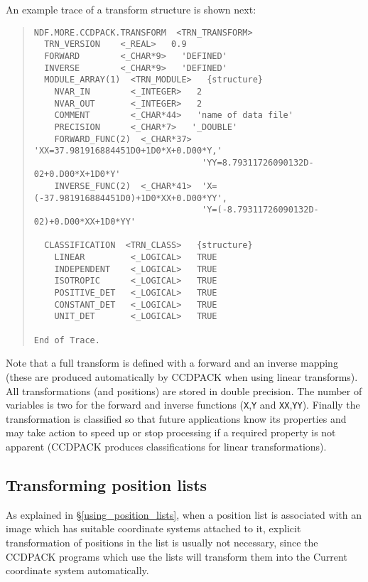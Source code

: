 \documentclass[twoside,11pt]{article}
\newcommand{\hyperref}[4]{#2\ref{#4}#3}
\newcommand{\xlabel}[1]{}
\renewcommand{\_}{\texttt{\symbol{95}}}
\newenvironment{myquote}{\begin{quote}\begin{small}}{\end{small}\end{quote}}
\newcommand{\text}[1]{{\small \tt #1}}
\begin{document}
An example trace of a transform structure is shown next:
\begin{myquote}
\begin{verbatim}
NDF.MORE.CCDPACK.TRANSFORM  <TRN_TRANSFORM>
  TRN_VERSION    <_REAL>   0.9
  FORWARD        <_CHAR*9>   'DEFINED'
  INVERSE        <_CHAR*9>   'DEFINED'
  MODULE_ARRAY(1)  <TRN_MODULE>   {structure}
    NVAR_IN        <_INTEGER>   2
    NVAR_OUT       <_INTEGER>   2
    COMMENT        <_CHAR*44>   'name of data file'
    PRECISION      <_CHAR*7>   '_DOUBLE'
    FORWARD_FUNC(2)  <_CHAR*37>  'XX=37.981916884451D0+1D0*X+0.D00*Y,'
                                 'YY=8.79311726090132D-02+0.D00*X+1D0*Y'
    INVERSE_FUNC(2)  <_CHAR*41>  'X=(-37.981916884451D0)+1D0*XX+0.D00*YY',
                                 'Y=(-8.79311726090132D-02)+0.D00*XX+1D0*YY'

  CLASSIFICATION  <TRN_CLASS>   {structure}
    LINEAR         <_LOGICAL>   TRUE
    INDEPENDENT    <_LOGICAL>   TRUE
    ISOTROPIC      <_LOGICAL>   TRUE
    POSITIVE_DET   <_LOGICAL>   TRUE
    CONSTANT_DET   <_LOGICAL>   TRUE
    UNIT_DET       <_LOGICAL>   TRUE

End of Trace.
\end{verbatim}
\end{myquote}
Note that a full transform is defined with a forward and an inverse
mapping (these are produced automatically by CCDPACK when using linear
transforms). All transformations (and positions) are stored in double
precision. The number of variables is two for the forward and inverse
functions (\text{X},\text{Y} and \text{XX},\text{YY}). Finally
the transformation is classified so that future applications know its
properties and may take action to speed up or stop processing if a
required property is not apparent (CCDPACK produces classifications for
linear transformations).


\subsection{Transforming\xlabel{transformingpositions} position lists}

As explained in
\hyperref{the section on position lists}{\S}{}{using_position_lists}, 
when a position list is associated with an image which has
suitable coordinate systems attached to it,
explicit transformation of positions in the list is usually not necessary,
since the CCDPACK programs which use the lists will transform them
into the Current coordinate system automatically.
\end{document}
